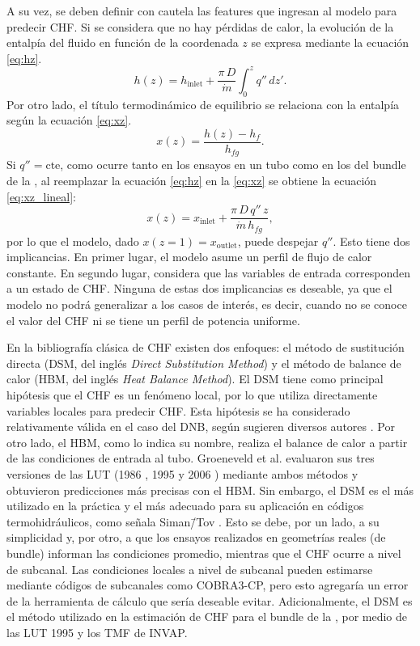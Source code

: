 A su vez, se deben definir con cautela las features que ingresan al modelo para predecir CHF. Si se considera que no hay pérdidas de calor, la evolución de la entalpía del fluido en función de la coordenada $z$ se expresa mediante la ecuación \ref{eq:hz}.
\begin{equation}
    h(z) = h_\mathrm{inlet} + \frac{\pi\,D}{\dot{m}} \int_0^z q''\,dz'.
    \label{eq:hz}
\end{equation}
Por otro lado, el título termodinámico de equilibrio se relaciona con la entalpía según la ecuación \ref{eq:xz}.
\begin{equation}
    x(z) = \frac{h(z) - h_f}{h_{fg}}.
    \label{eq:xz}
\end{equation}
Si $q''=\mathrm{cte}$, como ocurre tanto en los ensayos en un tubo como en los del bundle de la \cna{}, al reemplazar la ecuación \ref{eq:hz} en la \ref{eq:xz} se obtiene la ecuación \ref{eq:xz_lineal}:
\begin{equation}
    \label{eq:xz_lineal}
    x(z) = x_\mathrm{inlet} + \frac{\pi\,D\,q''\,z}{\dot{m}\,h_{fg}},
\end{equation}
por lo que el modelo, dado $x(z=1)=x_\mathrm{outlet}$, puede despejar $q''$. Esto tiene dos implicancias. En primer lugar, el modelo asume un perfil de flujo de calor constante. En segundo lugar, considera que las variables de entrada corresponden a un estado de CHF. Ninguna de estas dos implicancias es deseable, ya que el modelo no podrá generalizar a los casos de interés, es decir, cuando no se conoce el valor del CHF ni se tiene un perfil de potencia uniforme.

En la bibliografía clásica de CHF existen dos enfoques: el método de sustitución directa (DSM, del inglés \textit{Direct Substitution Method}) y el método de balance de calor (HBM, del inglés \textit{Heat Balance Method}). El DSM tiene como principal hipótesis que el CHF es un fenómeno local, por lo que utiliza directamente variables locales para predecir CHF. Esta hipótesis se ha considerado relativamente válida en el caso del DNB, según sugieren diversos autores \citep{weisman1983, tong1997boiling, lecorre2010}. Por otro lado, el HBM, como lo indica su nombre, realiza el balance de calor a partir de las condiciones de entrada al tubo.
Groeneveld et al. evaluaron sus tres versiones de las LUT (1986 \citep{GROENEVELD1986}, 1995 \citep{GROENEVELD1996} y 2006 \citep{GROENEVELD2007}) mediante ambos métodos y obtuvieron predicciones más precisas con el HBM. 
Sin embargo, el DSM es el más utilizado en la práctica y el más adecuado para su aplicación en códigos termohidráulicos, como señala Siman\=/Tov \citep{SIMANTOV1996}. Esto se debe, por un lado, a su simplicidad y, por otro, a que los ensayos realizados en geometrías reales (de bundle) informan las condiciones promedio, mientras que el CHF ocurre a nivel de subcanal. Las condiciones locales a nivel de subcanal pueden estimarse mediante códigos de subcanales como COBRA3-CP, pero esto agregaría un error de la herramienta de cálculo que sería deseable evitar.
Adicionalmente, el DSM es el método utilizado en la estimación de CHF para el bundle de la \cna{}, por medio de las LUT 1995 y los TMF de INVAP.

